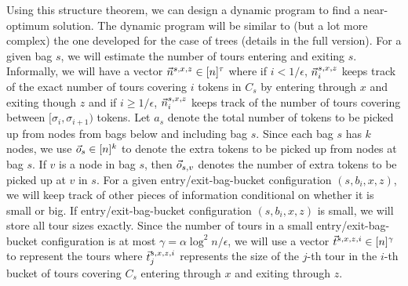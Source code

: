 \documentclass[twoside,leqno]{article}
\newcommand{\eps}{\epsilon}
\begin{document}
Using this structure theorem, we can design a dynamic program to find a near-optimum
solution. The dynamic program will be similar to (but a lot more complex) the one developed for the case of trees (details in the full version).
For a given bag $s$, we will estimate the number of tours entering and exiting $s$. Informally, we will have a vector $\vec{n}^{s,x,z} \in [n]^\tau$ where if $i < 1/\eps$, $\vec{n}_{i}^{s,x,z}$ keeps track of the exact number of tours covering $i$ tokens in $C_s$ by entering through $x$ and exiting though $z$ and if $i \ge 1/\eps$, $\vec{n}_{i}^{s,x,z}$ keeps track of the number of tours covering between $[\sigma_i, \sigma_{i+1})$ tokens. Let $a_s$ denote the total number of tokens to be picked up from nodes from bags below and including bag $s$. Since each bag $s$ has $k$ nodes, we use $\vec{o}_s \in [n]^{k}$ to denote the extra tokens to be picked up from nodes at bag $s$. If $v$ is a node in bag $s$, then $\vec{o}_{s,v}$ denotes the number of extra tokens to be picked up at $v$ in $s$. For a given entry/exit-bag-bucket configuration $(s,b_i,x,z)$, we will keep track of other pieces of information conditional on whether it is small or big. If entry/exit-bag-bucket configuration $(s,b_i,x,z)$ is small, we will store all tour sizes exactly. Since the number of tours in a small entry/exit-bag-bucket configuration is at most $\gamma = \alpha \log^2n /\eps$, we will use a vector $\vec{t}^{s,x,z,i} \in [n]^\gamma$ to represent the tours where  $\vec{t}^{s,x,z,i}_j$ represents the size of the $j$-th tour in the $i$-th bucket of tours covering $C_s$ entering through $x$ and exiting through $z$.
\end{document}
